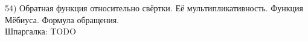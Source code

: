 54) Обратная функция относительно свёртки. Её мультипликативность. Функция Мёбиуса. Формула обращения.\\
Шпаргалка: TODO\\

